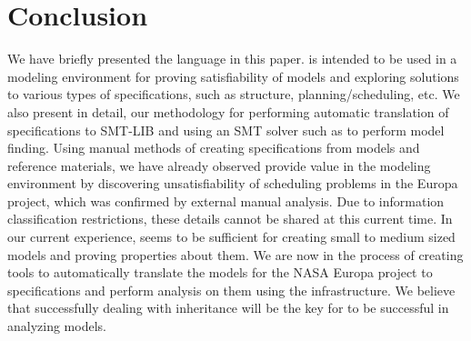 
\section{Conclusion}
\label{sec:conclusion}

We have briefly presented the \Klang{} language in this
paper. \Klang{} is intended to be used in a modeling environment for
proving satisfiability of models and exploring solutions to various
types of specifications, such as structure, planning/scheduling,
etc. We also present in detail, our methodology for performing
automatic translation of \Klang{} specifications to SMT-LIB and using
an SMT solver such as \zthree{} to perform model finding. Using manual
methods of creating \Klang{} specifications from \sysml{} models and
reference materials, we have already observed \Klang{} provide value
in the modeling environment by discovering unsatisfiability of
scheduling problems in the Europa project, which was confirmed by
external manual analysis. Due to information classification
restrictions, these details cannot be shared at this current time. In
our current experience, \Klang{} seems to be sufficient for creating
small to medium sized \sysml{} models and proving properties about
them. We are now in the process of creating tools to automatically
translate the \sysml{} models for the NASA Europa project to \Klang{}
specifications and perform analysis on them using the \Klang{}
infrastructure. We believe that successfully dealing with inheritance
will be the key for \Klang{} to be successful in analyzing \sysml{}
models.

